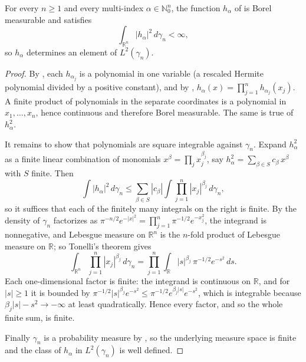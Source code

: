 \begin{lemma}
For every $n \geq 1$ and every multi-index $\alpha \in \mathbb{N}_0^n$, the function
$h_\alpha$ of  is Borel measurable and satisfies
\[
  \int_{\mathbb{R}^n} |h_\alpha|^2 \, d\gamma_n < \infty ,
\]
so $h_\alpha$ determines an element of $L^2(\gamma_n)$.
\end{lemma}
\begin{proof}
By , each $h_{\alpha_j}$ is a polynomial in one variable (a
rescaled Hermite polynomial divided by a positive constant), and by
, $h_\alpha(x) = \prod_{j=1}^n h_{\alpha_j}(x_j)$.  A finite
product of polynomials in the separate coordinates is a polynomial in
$x_1,\ldots,x_n$, hence continuous and therefore Borel measurable.  The same is
true of $h_\alpha^2$.

It remains to show that polynomials are square integrable against $\gamma_n$.
Expand $h_\alpha^2$ as a finite linear combination of monomials
$x^\beta = \prod_{j} x_j^{\beta_j}$, say
$h_\alpha^2 = \sum_{\beta \in S} c_\beta\, x^\beta$ with $S$ finite.  Then
\[
  \int |h_\alpha|^2 \, d\gamma_n
    \leq \sum_{\beta \in S} |c_\beta| \int \prod_{j=1}^n |x_j|^{\beta_j}\, d\gamma_n ,
\]
so it suffices that each of the finitely many integrals on the right is finite.
By  the density of $\gamma_n$ factorizes as
$\pi^{-n/2}e^{-|x|^2} = \prod_{j=1}^n \pi^{-1/2}e^{-x_j^2}$, the integrand is
nonnegative, and Lebesgue measure on $\mathbb{R}^n$ is the $n$-fold product of
Lebesgue measure on $\mathbb{R}$; so Tonelli's theorem gives
\[
  \int_{\mathbb{R}^n} \prod_{j=1}^n |x_j|^{\beta_j}\, d\gamma_n
    = \prod_{j=1}^n \int_{\mathbb{R}} |s|^{\beta_j}\, \pi^{-1/2} e^{-s^2}\, ds .
\]
Each one-dimensional factor is finite: the integrand is continuous on
$\mathbb{R}$, and for $|s| \geq 1$ it is bounded by
$\pi^{-1/2}|s|^{\beta_j}e^{-s^2} \leq \pi^{-1/2} e^{\beta_j |s|} e^{-s^2}$, which
is integrable because $\beta_j|s| - s^2 \to -\infty$ at least quadratically.
Hence every factor, and so the whole finite sum, is finite.

Finally $\gamma_n$ is a probability measure by , so the
underlying measure space is finite and the class of $h_\alpha$ in $L^2(\gamma_n)$
is well defined.
\end{proof}
